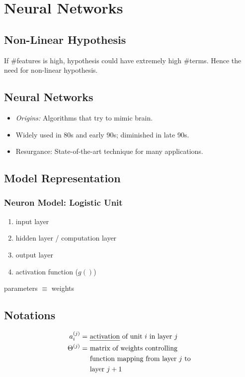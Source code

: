 \chapter{Neural Networks}
\section{Non-Linear Hypothesis}
If $\#$features is high, hypothesis could have extremely high
$\#$terms. Hence the need for non-linear hypothesis.

\section{Neural Networks}
\begin{itemize}
	\item \emph{Origins:} Algorithms that try to mimic brain.
	\item Widely used in 80s and early 90s; diminished in late 90s.
	\item Resurgance: State-of-the-art technique for many applications.
\end{itemize}

\section{Model Representation}
\subsection*{Neuron Model: Logistic Unit}
\begin{enumerate}
	\item input layer
	\item hidden layer / computation layer
	\item output layer
	\item activation function ($g()$)
\end{enumerate}
parameters $\equiv$ weights

\section{Notations}
\begin{align*}
	a_i^{(j)}    = & \text{ \emph{activation} of unit } i \text{ in layer } j \\
	\Theta^{(j)} = & \text{ matrix of weights controlling}                    \\
	               & \text{ function mapping from layer } j \text{ to}        \\
	               & \text{ layer } j + 1                                     \\
\end{align*}

